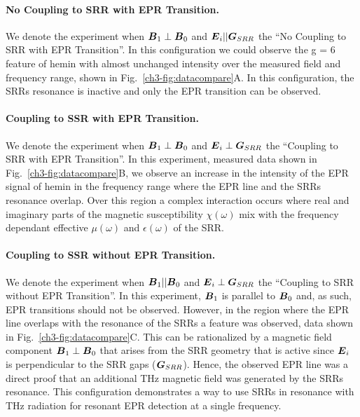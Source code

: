 \noindent \paragraph*{No Coupling to SRR with EPR Transition.} We denote the experiment when $\boldsymbol{B}_{1}\perp\boldsymbol{B}_{0}$ and $\boldsymbol{E}_{i}||\boldsymbol{G}_{SRR}$ the ``No Coupling to SRR with EPR Transition''. In this configuration we could observe the g = 6 feature of hemin with almost unchanged intensity over the measured field and frequency range, shown in Fig.~\ref{ch3-fig:datacompare}A. In this configuration, the SRRs resonance is inactive and only the EPR transition can be observed. 

\noindent \paragraph*{Coupling to SSR with EPR Transition.} We denote the experiment when $\boldsymbol{B}_{1}\perp\boldsymbol{B}_{0}$ and $\boldsymbol{E}_{i}\perp\boldsymbol{G}_{SRR}$ the ``Coupling to SRR with EPR Transition''. In this experiment, measured data shown in Fig.~\ref{ch3-fig:datacompare}B, we observe an increase in the intensity of the EPR signal of hemin in the frequency range where the EPR line and the SRRs resonance overlap. Over this region a complex interaction occurs where real and imaginary parts of the magnetic susceptibility $\chi(\omega)$ mix with the frequency dependant effective $\mu(\omega)$ and $\epsilon(\omega)$ of the SRR.

\noindent \paragraph*{Coupling to SSR without EPR Transition.}
We denote the experiment when $\boldsymbol{B}_{1} || \boldsymbol{B}_{0}$ and $\boldsymbol{E}_{i}\perp\boldsymbol{G}_{SRR}$ the ``Coupling to SRR without EPR Transition''. In this experiment, $\boldsymbol{B}_{1}$ is parallel to $\boldsymbol{B}_{0}$ and, as such, EPR transitions should not be observed. However, in the region where the EPR line overlaps with the resonance of the SRRs a feature was observed, data shown in Fig.~\ref{ch3-fig:datacompare}C. This can be rationalized by a magnetic field component $\boldsymbol{B}_{1}\perp\boldsymbol{B}_{0}$ that arises from the SRR geometry that is active since $\boldsymbol{E}_{i}$ is perpendicular to the SRR gaps ($\boldsymbol{G}_{SRR}$). Hence, the observed EPR line was a direct proof that an additional THz magnetic field was generated by the SRRs resonance. This configuration demonstrates a way to use SRRs in resonance with THz radiation for resonant EPR detection at a single frequency. 

